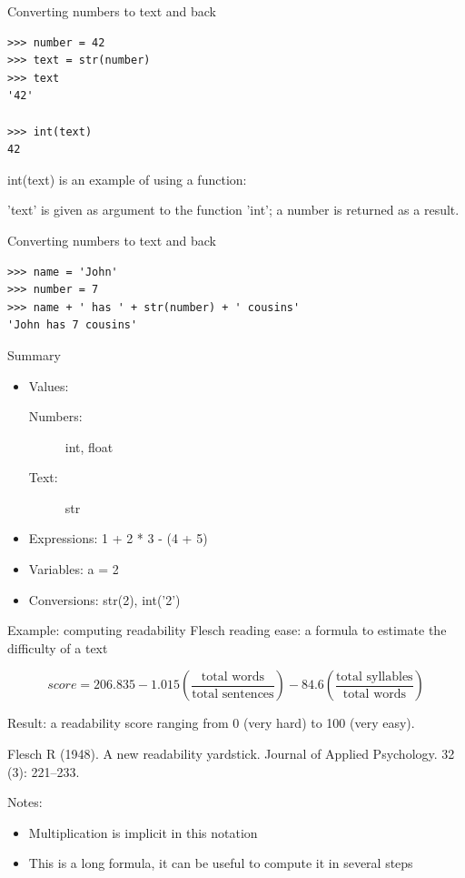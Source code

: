 \documentclass{beamer}
\begin{document}
\begin{frame}[fragile]{Converting numbers to text and back}
\begin{lstlisting}
>>> number = 42
>>> text = str(number)
>>> text
'42'

>>> int(text)
42
\end{lstlisting}

    int(text) is an example of using a function:

    'text' is given as argument to the function 'int';
    a number is returned as a result.
\end{frame}


\begin{frame}[fragile]{Converting numbers to text and back}
\begin{lstlisting}
>>> name = 'John'
>>> number = 7
>>> name + ' has ' + str(number) + ' cousins'
'John has 7 cousins'
\end{lstlisting}
\end{frame}

\begin{frame}{Summary}
    \begin{itemize}
        \item Values:
            \begin{description}
                \item[Numbers:] int, float
                \item[Text:] str
            \end{description}
        \item Expressions: 1 + 2 * 3 - (4 + 5)
        \item Variables: a = 2
        \item Conversions: str(2), int('2')
    \end{itemize}
\end{frame}

\begin{frame}{Example: computing readability}
    Flesch reading ease: a formula to estimate the difficulty of a text

    \[
        score = 206.835 - 1.015 ( \frac{\textrm{total words}}{\textrm{total sentences}} )
            - 84.6 ( \frac{\textrm{total syllables}}{\textrm{total words}} )
    \]

    Result: a readability score ranging from 0 (very hard) to 100 (very easy).

    \vspace{1em}
    Flesch R (1948). A new readability yardstick. Journal of Applied Psychology. 32 (3): 221–233.

    \pause
    Notes:
    \begin{itemize}
        \item Multiplication is implicit in this notation
        \item This is a long formula, it can be useful to compute
            it in several steps %
    \end{itemize}
\end{frame}
\end{document}
